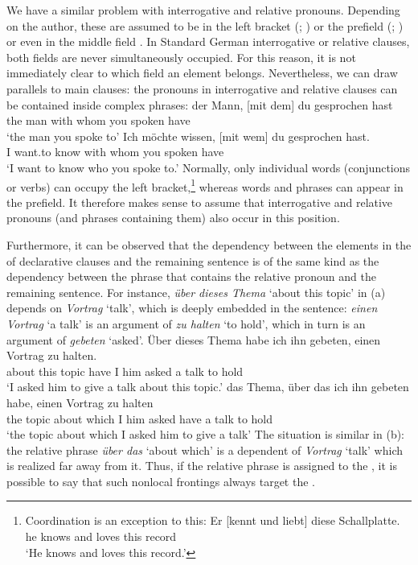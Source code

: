 {We have a similar problem with interrogative and relative pronouns. Depending on the author, these are assumed to be in the
left bracket (\citealp{Kathol2001a}; \citealp[]{Eisenberg2004a}) or the prefield
(\citealp[§1345]{Duden2005-Authors}; \citealp[--30, Section~3.1]{Woellstein2010a-u}) or even in the
middle field \citep[]{AH2004a-u}. In Standard German interrogative or relative
clauses, both fields are never simultaneously
occupied. For this reason, it is not immediately clear to which field an element
belongs. Nevertheless, we can draw parallels to main clauses: the pronouns in  interrogative and
relative clauses can be contained inside complex phrases: 
\eal
\ex 
\gll der Mann,         [mit dem] du gesprochen hast\\
     the man \spacebr{}with whom you spoken have\\
\glt `the man you spoke to'	 
\ex 
\gll Ich möchte wissen, [mit wem] du gesprochen hast.\\
     I want.to know \spacebr{}with whom you spoken have\\
\glt `I want to know who you spoke to.'
\zl
Normally, only individual words (conjunctions or verbs) can occupy the left bracket,\footnote{
 Coordination is an exception to this:
\ea
\gll Er [kennt und liebt] diese Schallplatte.\\
     he \spacebr{}knows and loves this record\\
\glt `He knows and loves this record.'
\z
} 
whereas words and phrases can appear in the prefield. It therefore makes sense to assume that interrogative and relative pronouns (and phrases containing them)
also occur in this position. 

Furthermore, it can be observed that the dependency between the elements in the \vf of declarative
clauses and the remaining sentence is of the same kind as the dependency between the phrase that
contains the relative pronoun and the remaining sentence. For instance, \emph{über dieses Thema}
`about this topic' in (a)
depends on \emph{Vortrag} `talk', which is deeply embedded in the sentence:
\emph{einen Vortrag} `a talk' is an argument of \emph{zu halten} `to hold', which in turn is an
argument of \emph{gebeten} `asked'.
\eal
\ex 
\gll Über dieses Thema habe ich ihn gebeten, einen Vortrag zu halten.\\
     about this topic  have I   him asked    a     talk    to hold\\
\glt `I asked him to give a talk about this topic.'
\ex 
\gll das Thema, über das ich ihn gebeten habe, einen Vortrag zu halten\\
     the topic  about which I him asked have a talk to hold\\
\glt `the topic about which I asked him to give a talk'
\zl
The situation is similar in (b): the relative phrase \emph{über das} `about which' is a dependent of
\emph{Vortrag} `talk' which is realized far away from it. Thus, if the relative phrase is assigned to the \vf, it is
possible to say that such nonlocal frontings always target the \vf.

}
